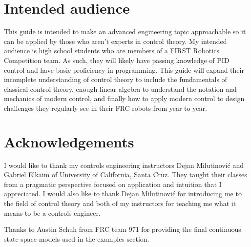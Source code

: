 \section*{Intended audience}

This guide is intended to make an advanced engineering topic approachable so it
can be applied by those who aren't experts in control theory. My intended
audience is high school students who are members of a FIRST Robotics Competition
team. As such, they will likely have passing knowledge of PID control and have
basic proficiency in programming. This guide will expand their incomplete
understanding of control theory to include the fundamentals of classical control
theory, enough linear algebra to understand the notation and mechanics of modern
control, and finally how to apply modern control to design challenges they
regularly see in their FRC robots from year to year.

\section*{Acknowledgements}

I would like to thank my controls engineering instructors Dejan Milutinovi\'c
and Gabriel Elkaim of University of California, Santa Cruz. They taught their
classes from a pragmatic perspective focused on application and intuition that I
appreciated. I would also like to thank Dejan Milutinovi\'c for introducing me
to the field of control theory and both of my instructors for teaching me what
it means to be a controls engineer.

Thanks to Austin Schuh from FRC team 971 for providing the final continuous
state-space models used in the examples section.

\cleardoublepage
